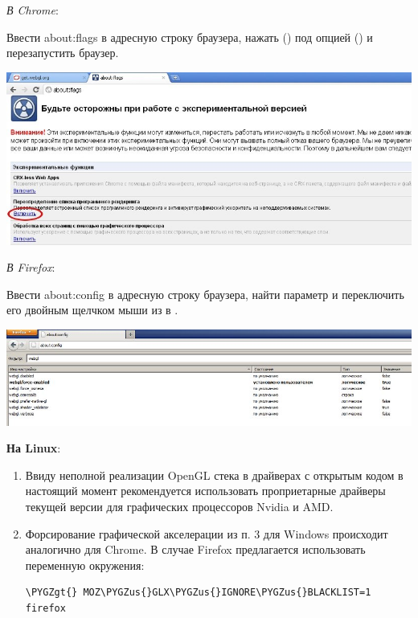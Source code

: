 \documentclass[a4paper,12pt,oneside]{sphinxmanual}
\def\PYGZus{\char`\_}
\def\PYGZgt{\char`\>}
\begin{document}
\emph{В Chrome}:

Ввести about:flags в адресную строку браузера, нажать  () под опцией  () и перезапустить браузер.

{\hfill\includegraphics[width=1.000\linewidth]{about_flags_force_webgl.jpg}\hfill}

\emph{В Firefox}:

Ввести about:config в адресную строку браузера, найти параметр  и переключить его двойным щелчком мыши из  в .

{\hfill\includegraphics[width=1.000\linewidth]{about_config_force_webgl.jpg}\hfill}

\textbf{На Linux}:
\begin{enumerate}
\item {} 
Ввиду неполной реализации OpenGL стека в драйверах с открытым кодом в настоящий момент рекомендуется использовать проприетарные драйверы текущей версии для графических процессоров Nvidia и AMD.

\item {} 
Форсирование графической акселерации из п. 3 для Windows происходит аналогично для Chrome. В случае Firefox предлагается использовать переменную окружения:

\begin{Verbatim}[commandchars=\\\{\}]
\PYGZgt{} MOZ\PYGZus{}GLX\PYGZus{}IGNORE\PYGZus{}BLACKLIST=1 firefox
\end{Verbatim}

\end{enumerate}
\end{document}
